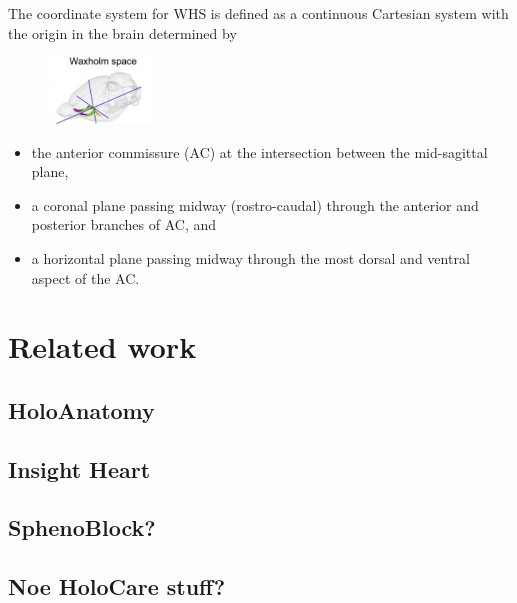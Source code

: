 \noindent The coordinate system for WHS is defined as a continuous Cartesian system with the origin in the brain determined by
\begin{figure} 
    \centering
    \includegraphics[width=0.25\textwidth]{fig/waxholmspace}
    \label{waxholmspace}
\end{figure}
\begin{itemize}
    \item the anterior commissure (AC) at the intersection between the mid-sagittal plane,
    \item a coronal plane passing midway (rostro-caudal) through the anterior and posterior branches of AC, and
    \item a horizontal plane passing midway through the most dorsal and ventral aspect of the AC.
\end{itemize}




\section{Related work}

\subsection*{HoloAnatomy}

\subsection*{Insight Heart}

\subsection*{SphenoBlock?}

\subsection*{Noe HoloCare stuff?}

